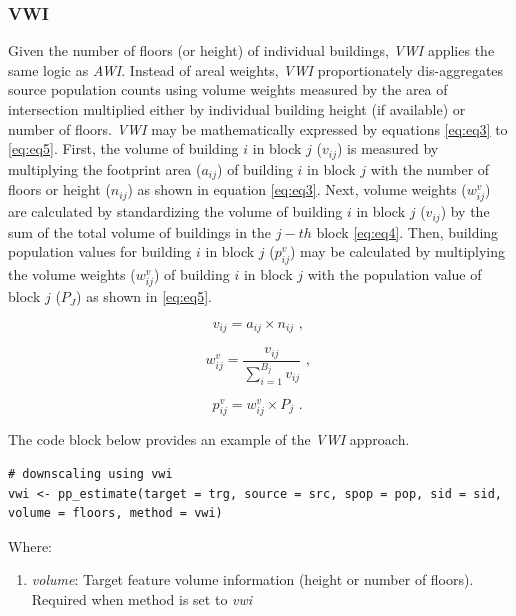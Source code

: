 \hypertarget{vwi}{%
\subsubsection{VWI}\label{vwi}}

Given the number of floors (or height) of individual buildings, \emph{VWI} applies the same logic as \emph{AWI}. Instead of areal weights, \emph{VWI} proportionately dis-aggregates source population counts using volume weights measured by the area of intersection multiplied either by individual building height (if available) or number of floors. \emph{VWI} may be mathematically expressed by equations \eqref{eq:eq3} to \eqref{eq:eq5}. First, the volume of building \(i\) in block \(j\) (\(v_{ij}\)) is measured by multiplying the footprint area (\(a_{ij}\)) of building \(i\) in block \(j\) with the number of floors or height (\(n_{ij}\)) as shown in equation \eqref{eq:eq3}. Next, volume weights (\(w^v_{ij}\)) are calculated by standardizing the volume of building \(i\) in block \(j\) (\(v_{ij}\)) by the sum of the total volume of buildings in the \(j-th\) block \eqref{eq:eq4}. Then, building population values for building \(i\) in block \(j\) (\(p^v_{ij}\)) may be calculated by multiplying the volume weights (\(w^v_{ij}\)) of building \(i\) in block \(j\) with the population value of block \(j\) (\(P_J\)) as shown in \eqref{eq:eq5}.

\begin{equation} 
    v_{ij} = a_{ij} \times n_{ij} \text{ , }
    \label{eq:eq3}
\end{equation}

\begin{equation} 
    w_{ij}^v = \frac{v_{ij}}{\sum_{i=1}^{B_{j}} v_{ij}} \text{ , }
    \label{eq:eq4}
\end{equation}

\begin{equation} 
    p_{ij}^v = w_{ij}^v \times P_j \text{ . }
    \label{eq:eq5}
\end{equation}

The code block below provides an example of the \emph{VWI} approach.

\begin{verbatim}
# downscaling using vwi
vwi <- pp_estimate(target = trg, source = src, spop = pop, sid = sid,
volume = floors, method = vwi)
\end{verbatim}

Where:

\begin{enumerate}
\def\labelenumi{\arabic{enumi}.}
\tightlist
\item
  \emph{volume}: Target feature volume information (height or number of floors). Required when method
  is set to \emph{vwi}
\end{enumerate}

